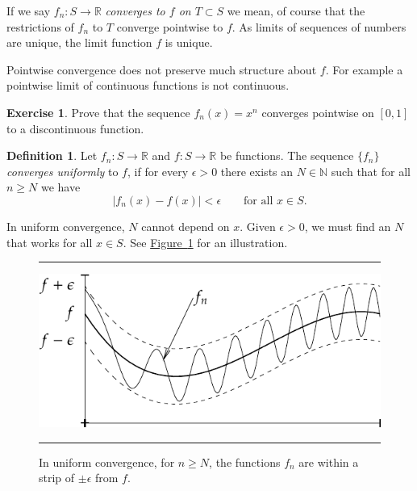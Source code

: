 \documentclass[12pt,openany]{book}
\newcommand{\abs}[1]{\left\lvert {#1} \right\rvert}
\newcommand{\R}{{\mathbb{R}}}
\newcommand{\N}{{\mathbb{N}}}
\newcommand{\myindex}[1]{#1\index{#1}}
\theoremstyle{plain}
\theoremstyle{remark}
\theoremstyle{definition}
\newtheorem{defn}[thm]{Definition}
\newenvironment{exbox}{%
    \def\FrameCommand{\vrule width 1pt \relax\hspace {10pt}}%
    \MakeFramed {\advance \hsize -\width \FrameRestore }%
}{%
    \endMakeFramed
}
\newenvironment{myfig}{%
\begin{figure}[h!t]
\noindent\rule{\textwidth}{0.4pt}\vspace{12pt}\par\centering}%
{\par\noindent\rule{\textwidth}{0.4pt}
\end{figure}}
\theoremstyle{exercise}
\newtheorem{exercise}{Exercise}[section]
\theoremstyle{example}
\newtheorem{example}[thm]{Example}
\newcommand{\figureref}[1]{\hyperref[#1]{Figure~\ref*{#1}}}
\begin{document}
If we say $f_n \colon S \to \R$
\emph{converges to $f$ on $T \subset S$}
we mean, of course that
the restrictions of $f_n$ to $T$ converge pointwise to $f$.
As limits of sequences of numbers are unique, the limit function $f$ is unique.

Pointwise convergence does not preserve much structure about $f$.
For example a pointwise limit of continuous functions is not continuous.

\begin{exbox}
\begin{exercise}
Prove that the sequence $f_n(x) = x^{n}$ converges pointwise on $[0,1]$ to
a discontinuous function.
\end{exercise}
\end{exbox}


\begin{defn}
Let $f_n \colon S \to \R$
and $f \colon S \to \R$
be functions.  The sequence $\{ f_n \}$
\emph{\myindex{converges uniformly}} to $f$, if for
every $\epsilon > 0$ there exists an $N \in \N$ such that 
for all $n \geq N$ we have
\begin{equation*}
\abs{f_n(x) - f(x)} < \epsilon \qquad \text{for all } x \in S.
\end{equation*}
\end{defn}

In uniform convergence, $N$ cannot depend on $x$.  Given $\epsilon > 0$,
we must find an $N$ that works for all $x \in S$.  See
\figureref{fig:uniformconv} for an illustration.
\begin{myfig}
\includegraphics{figures/uniformconv}
\caption{In uniform convergence,
for $n \geq N$,
the functions $f_n$ are within a strip of $\pm\epsilon$ from $f$.%
\label{fig:uniformconv}}
\end{myfig}
\end{document}
